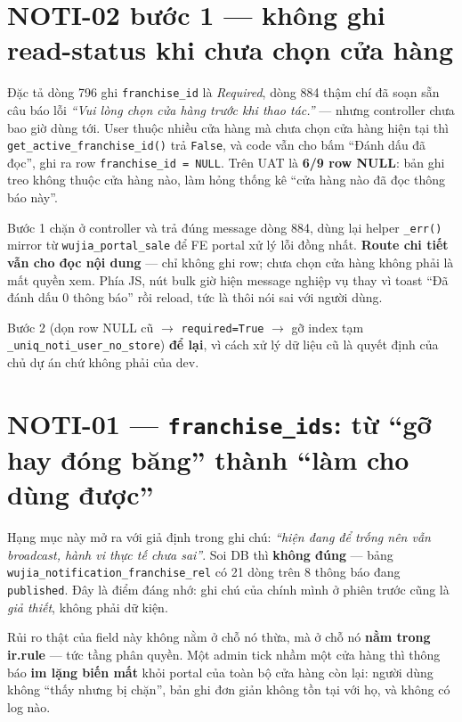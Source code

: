 \section{NOTI-02 bước 1 --- không ghi read-status khi chưa chọn cửa hàng}

Đặc tả dòng 796 ghi \texttt{franchise\_id} là \emph{Required}, dòng 884 thậm chí đã soạn sẵn câu báo
lỗi \emph{``Vui lòng chọn cửa hàng trước khi thao tác.''} --- nhưng controller chưa bao giờ dùng tới.
User thuộc nhiều cửa hàng mà chưa chọn cửa hàng hiện tại thì \texttt{get\_active\_franchise\_id()}
trả \texttt{False}, và code vẫn cho bấm ``Đánh dấu đã đọc'', ghi ra row
\texttt{franchise\_id = NULL}. Trên UAT là \textbf{6/9 row NULL}: bản ghi treo không thuộc cửa hàng
nào, làm hỏng thống kê ``cửa hàng nào đã đọc thông báo này''.

Bước 1 chặn ở controller và trả đúng message dòng 884, dùng lại helper \texttt{\_err()} mirror từ
\texttt{wujia\_portal\_sale} để FE portal xử lý lỗi đồng nhất. \textbf{Route chi tiết vẫn cho đọc
nội dung} --- chỉ không ghi row; chưa chọn cửa hàng không phải là mất quyền xem. Phía JS, nút bulk
giờ hiện message nghiệp vụ thay vì toast ``Đã đánh dấu 0 thông báo'' rồi reload, tức là thôi nói sai
với người dùng.

Bước 2 (dọn row NULL cũ $\to$ \texttt{required=True} $\to$ gỡ index tạm
\texttt{\_uniq\_noti\_user\_no\_store}) \textbf{để lại}, vì cách xử lý dữ liệu cũ là quyết định của
chủ dự án chứ không phải của dev.

\section{NOTI-01 --- \texttt{franchise\_ids}: từ ``gỡ hay đóng băng'' thành ``làm cho dùng được''}

Hạng mục này mở ra với giả định trong ghi chú: \emph{``hiện đang để trống nên vẫn broadcast, hành vi
thực tế chưa sai''}. Soi DB thì \textbf{không đúng} --- bảng \texttt{wujia\_notification\_franchise\_rel}
có 21 dòng trên 8 thông báo đang \texttt{published}. Đây là điểm đáng nhớ: ghi chú của chính mình ở
phiên trước cũng là \emph{giả thiết}, không phải dữ kiện.

Rủi ro thật của field này không nằm ở chỗ nó thừa, mà ở chỗ nó \textbf{nằm trong ir.rule}
--- tức tầng phân quyền. Một admin tick nhầm một cửa hàng thì thông báo \textbf{im lặng biến mất}
khỏi portal của toàn bộ cửa hàng còn lại: người dùng không ``thấy nhưng bị chặn'', bản ghi đơn giản
không tồn tại với họ, và không có log nào.

